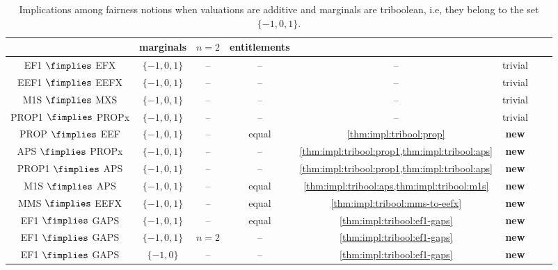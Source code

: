 \begin{table}[htb]
\centering
\caption[Tribool implications]{Implications among fairness notions when
valuations are additive and marginals are triboolean,
i.e, they belong to the set $\{-1, 0, 1\}$.}
\label{table:impls-tribool}
\begin{tabular}{cccccccc}
\toprule & \small marginals & \small $n=2$ & \small entitlements & &
\\\midrule EF1 $\fimplies$ EFX & $\{-1, 0, 1\}$
    & -- & -- & -- & trivial
\\[\defaultaddspace] EEF1 $\fimplies$ EEFX & $\{-1, 0, 1\}$
    & -- & -- & -- & trivial
\\[\defaultaddspace] M1S $\fimplies$ MXS & $\{-1, 0, 1\}$
    & -- & -- & -- & trivial
\\[\defaultaddspace] PROP1 $\fimplies$ PROPx & $\{-1, 0, 1\}$
    & -- & -- & -- & trivial
%
\\\midrule PROP $\fimplies$ EEF & $\{-1, 0, 1\}$
    & -- & equal & \cref{thm:impl:tribool:prop} & \textbf{new}
\\[\defaultaddspace] APS $\fimplies$ PROPx & $\{-1, 0, 1\}$
    & -- & -- & \cref{thm:impl:tribool:prop1,thm:impl:tribool:aps} & \textbf{new}
\\[\defaultaddspace] PROP1 $\fimplies$ APS & $\{-1, 0, 1\}$
    & -- & -- & \cref{thm:impl:tribool:prop1,thm:impl:tribool:aps} & \textbf{new}
\\[\defaultaddspace] M1S $\fimplies$ APS & $\{-1, 0, 1\}$
    & -- & equal & \cref{thm:impl:tribool:aps,thm:impl:tribool:m1s} & \textbf{new}
\\[\defaultaddspace] MMS $\fimplies$ EEFX & $\{-1, 0, 1\}$
    & -- & equal & \cref{thm:impl:tribool:mms-to-eefx} & \textbf{new}
%
\\\midrule EF1 $\fimplies$ GAPS & $\{-1, 0, 1\}$
    & -- & equal & \cref{thm:impl:tribool:ef1-gaps} & \textbf{new}
\\[\defaultaddspace] EF1 $\fimplies$ GAPS & $\{-1, 0, 1\}$
    & $n=2$ & -- & \cref{thm:impl:tribool:ef1-gaps} & \textbf{new}
\\[\defaultaddspace] EF1 $\fimplies$ GAPS & $\{-1, 0\}$
    & -- & -- & \cref{thm:impl:tribool:ef1-gaps} & \textbf{new}
\\ \bottomrule
\end{tabular}
\end{table}

